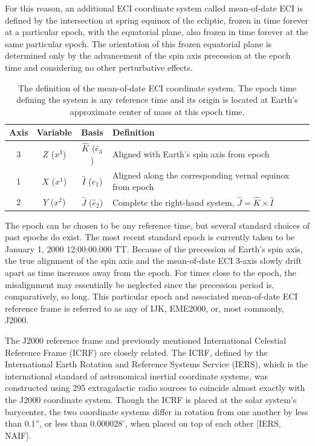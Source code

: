 \documentclass[11pt,dvipsnames]{thesis}
\begin{document}
For this reason, an additional ECI coordinate system called mean-of-date ECI is defined by the intersection at spring equinox of the ecliptic, frozen in time forever at a particular epoch, with the equatorial plane, also frozen in time forever at the same particular epoch. The orientation of this frozen equatorial plane is determined only by the advancement of the spin axis precession at the epoch time and considering no other perturbative effects.
\begin{table}[H]
\centering
\caption{The definition of the mean-of-date ECI coordinate system. The epoch time defining the system is any reference time and its origin is located at Earth's approximate center of mass at this epoch time.}
\label{tab:MODECI}
\begin{tabular}{SSSl}
\toprule
{Axis} & {Variable} & {Basis} & {Definition} \\ \midrule
{3} & {$Z$ ($x^3$)} & {$\hat{K}$ ($\hat{e}_3$)} & {Aligned with Earth's spin axis from epoch} \\
{1} & {$X$ ($x^1$)} & {$\hat{I}$ ($\hat{e}_1$)} & {Aligned along the corresponding vernal equinox from epoch} \\
{2} & {$Y$ ($x^2$)} & {$\hat{J}$ ($\hat{e}_2$)} & {Complete the right-hand system, $\hat{J} = \hat{K} \times \hat{I}$} \\ \bottomrule
\end{tabular}
\end{table}
The epoch can be chosen to be any reference time, but several standard choices of past epochs do exist. The most recent standard epoch is currently taken to be January 1, 2000 12:00:00.000 TT. Because of the precession of Earth's spin axis, the true alignment of the spin axis and the mean-of-date ECI 3-axis slowly drift apart as time increases away from the epoch. For times close to the epoch, the misalignment may essentially be neglected since the precession period is, comparatively, so long.  This particular epoch and associated mean-of-date ECI reference frame is referred to as any of IJK, EME2000, or, most commonly, J2000.

The J2000 reference frame and previously mentioned International Celestial Reference Frame (ICRF) are closely related. The ICRF, defined by the International Earth Rotation and Reference Systems Service (IERS), which is the international standard of astronomical inertial coordinate systems, was constructed using 295 extragalactic radio sources to coincide almost exactly with the J2000 coordinate system. Though the ICRF is placed at the solar system's barycenter, the two coordinate systems differ in rotation from one another by less than 0.1'', or less than $0.000028^\circ$, when placed on top of each other [IERS, NAIF].
\end{document}
